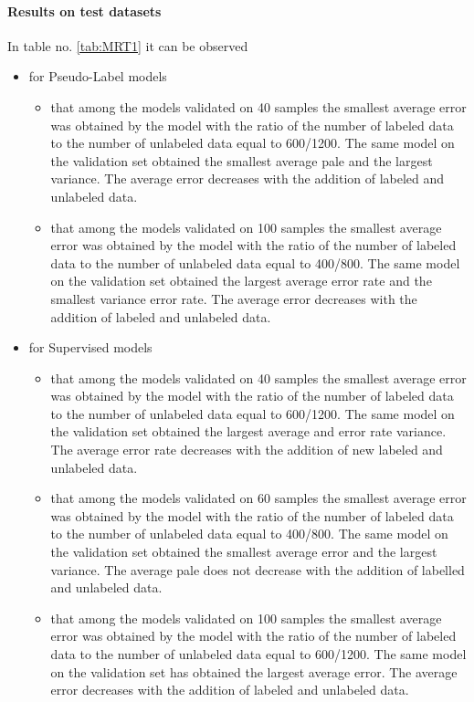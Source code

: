 \documentclass[12pt]{article}
\theoremstyle{definition}
\DeclareRobustCommand{\[}{\begin{equation}}
\DeclareRobustCommand{\]}{\end{equation}}
\begin{document}
\paragraph{Results on test datasets}
In table no. \ref{tab:MRT1} it  can be observed
\begin{itemize}
    \item for Pseudo-Label models
    \begin{itemize}
        \item that among the models validated on 40 samples the smallest average error was obtained by the model with the ratio of the number of labeled data to the number of unlabeled data equal to 600/1200. The same model on the validation set obtained the smallest average pale and the largest variance. The average error decreases with the addition of labeled and unlabeled data. 
        \item that among the models validated on 100 samples the smallest average error was obtained by the model with the ratio of the number of labeled data to the number of unlabeled data equal to 400/800. The same model on the validation set obtained the largest average error rate and the smallest variance error rate. The average error decreases with the addition of labeled and unlabeled data.
    \end{itemize}
    \item for Supervised models
    \begin{itemize}
        \item that among the models validated on 40 samples the smallest average error was obtained by the model with the ratio of the number of labeled data to the number of unlabeled data equal to 600/1200. The same model on the validation set obtained the largest average and error rate variance. The average error rate decreases with the addition of new labeled and unlabeled data.  
        \item that among the models validated on 60 samples the smallest average error was obtained by the model with the ratio of the number of labeled data to the number of unlabeled data equal to 400/800. The same model on the validation set obtained the smallest average error and the largest variance. The average pale does not decrease with the addition of labelled and unlabeled data. 
        \item that among the models validated on 100 samples the smallest average error was obtained by the model with the ratio of the number of labeled data to the number of unlabeled data equal to 600/1200. The same model on the validation set has obtained the largest average error. The average error decreases with the addition of labeled and unlabeled data.  
    \end{itemize}
\end{itemize}
\end{document}
